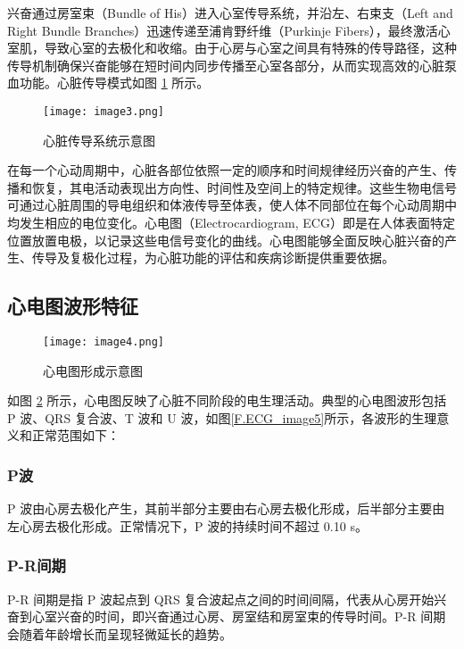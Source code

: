 兴奋通过房室束（Bundle of His）进入心室传导系统，并沿左、右束支（Left and Right Bundle Branches）迅速传递至浦肯野纤维（Purkinje Fibers），最终激活心室肌，导致心室的去极化和收缩。由于心房与心室之间具有特殊的传导路径，这种传导机制确保兴奋能够在短时间内同步传播至心室各部分，从而实现高效的心脏泵血功能。心脏传导模式如图 \ref{F.ECG_image3} 所示。

\begin{figure}[hbt]
    \centering
    \texttt{[image: image3.png]}
    \caption{心脏传导系统示意图\cite{现代医学电子仪器原理与设计}}
    \label{F.ECG_image3}
\end{figure}

在每一个心动周期中，心脏各部位依照一定的顺序和时间规律经历兴奋的产生、传播和恢复，其电活动表现出方向性、时间性及空间上的特定规律。这些生物电信号可通过心脏周围的导电组织和体液传导至体表，使人体不同部位在每个心动周期中均发生相应的电位变化。心电图（Electrocardiogram, ECG）即是在人体表面特定位置放置电极，以记录这些电信号变化的曲线。心电图能够全面反映心脏兴奋的产生、传导及复极化过程，为心脏功能的评估和疾病诊断提供重要依据。

\subsection{心电图波形特征}

\begin{figure}[hbt]
    \centering
    \texttt{[image: image4.png]}
    \caption{心电图形成示意图\cite{人体解剖生理学}}
    \label{F.ECG_image4}
\end{figure}

如图 \ref{F.ECG_image4} 所示，心电图反映了心脏不同阶段的电生理活动。典型的心电图波形包括 P 波、QRS 复合波、T 波和 U 波，如图\ref{F.ECG_image5}所示，各波形的生理意义和正常范围如下：

\subsubsection{P波}P 波由心房去极化产生，其前半部分主要由右心房去极化形成，后半部分主要由左心房去极化形成。正常情况下，P 波的持续时间不超过 0.10 s。

\subsubsection{P-R间期}P-R 间期是指 P 波起点到 QRS 复合波起点之间的时间间隔，代表从心房开始兴奋到心室兴奋的时间，即兴奋通过心房、房室结和房室束的传导时间。P-R 间期会随着年龄增长而呈现轻微延长的趋势。

